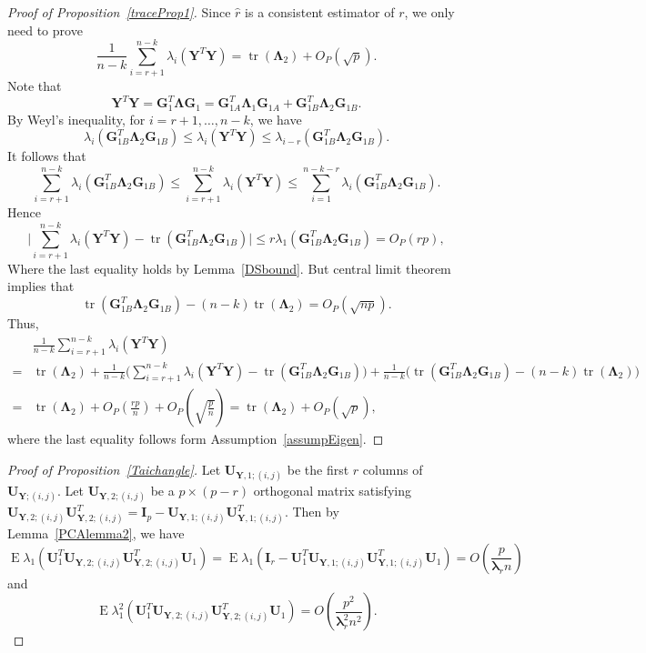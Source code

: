 \documentclass[12pt]{article} %
\DeclareMathOperator{\mytr}{tr}
\DeclareMathOperator{\myE}{E}
\newcommand{\bY}{\mathbf{Y}}
\newcommand{\bG}{\mathbf{G}}
\newcommand{\bI}{\mathbf{I}}
\newcommand{\bU}{\mathbf{U}}
\newcommand{\bfsym}[1]{\ensuremath{\boldsymbol{#1}}}
\def\blambda {\bfsym {\lambda}}
\def\bLambda {\bfsym {\Lambda}}
\theoremstyle{definition}
\begin{document}
\begin{appendices}
\begin{proof}[Proof of Proposition~\ref{traceProp1}]
    Since $\hat{r}$ is a consistent estimator of $r$, we only need to prove
    $$
    \frac{1 }{n-k}
        \sum_{i=r+1}^{n-k}\lambda_i(\bY^T\bY)
        =\mytr(\bLambda_2)+O_P(\sqrt{p}).
    $$
    Note that
$$
\bY^T \bY =\bG_1^T \bLambda \bG_1
=
\bG_{1A}^T \bLambda_1 \bG_{1A}+
\bG_{1B}^T \bLambda_2 \bG_{1B}.
$$
By Weyl's inequality, for $i=r+1,\ldots, n-k$, we have
$$
\lambda_{i}(\bG_{1B}^T \bLambda_2 \bG_{1B})\leq \lambda_i(\bY^T \bY)\leq \lambda_{i-r}(\bG_{1B}^T \bLambda_2 \bG_{1B}).
$$
It follows that
$$
\sum_{i=r+1}^{n-k}\lambda_{i}(\bG_{1B}^T \bLambda_2 \bG_{1B})\leq \sum_{i=r+1}^{n-k}\lambda_i(\bY^T \bY)\leq \sum_{i=1}^{n-k-r}\lambda_{i}(\bG_{1B}^T \bLambda_2 \bG_{1B}).
$$
Hence
$$
 \big|\sum_{i=r+1}^{n-k}\lambda_i(\bY^T \bY)- \mytr(\bG_{1B}^T \bLambda_2 \bG_{1B})\big|\leq r \lambda_1(\bG_{1B}^T \bLambda_2 \bG_{1B})=O_P(rp),
$$
    Where the last equality holds by Lemma~\ref{DSbound}.
But central limit theorem implies that
$$\mytr(\bG_{1B}^T \bLambda_2 \bG_{1B})-(n-k)\mytr(\bLambda_2)%
=O_P(\sqrt{np}).$$
Thus,
$$
    \begin{aligned}
        &\frac{1}{n-k}\sum_{i=r+1}^{n-k}\lambda_i (\bY^T \bY)\\
        =&\mytr(\bLambda_2)+
        \frac{1}{n-k}\big(\sum_{i=r+1}^{n-k}\lambda_i(\bY^T \bY)-\mytr(\bG_{1B}^T \bLambda_2 \bG_{1B})\big) +\frac{1}{n-k}\big(\mytr(\bG_{1B}^T \bLambda_2 \bG_{1B})-(n-k)\mytr(\bLambda_2)\big)\\
        =&\mytr(\bLambda_2)+O_P(\frac{rp}{n})+O_P(\sqrt{\frac{p}{n}})
        =\mytr(\bLambda_2)+O_P(\sqrt{p}),
    \end{aligned}
$$
    where the last equality follows form Assumption~\ref{assumpEigen}.
\end{proof}

    \begin{proof}[Proof of Proposition~\ref{Taichangle}]
        Let $\bU_{\bY,1;(i,j)}$ be the first $r$ columns of $\bU_{\bY;(i,j)}$.
        Let $\bU_{\bY,2;(i,j)}$ be a $p\times (p-r)$ orthogonal matrix satisfying $\bU_{\bY,2;(i,j)}\bU_{\bY,2;(i,j)}^T= \bI_p-\bU_{\bY,1;(i,j)}\bU_{\bY,1;(i,j)}^T$.
        Then by Lemma~\ref{PCAlemma2}, we have
        $$
        \myE\lambda_1(\bU_1^T \bU_{\bY,2;(i,j)}\bU_{\bY,2;(i,j)}^T \bU_1)
        =
        \myE\lambda_1(\bI_r-\bU_1^T \bU_{\bY,1;(i,j)}\bU_{\bY,1;(i,j)}^T \bU_1)
        =
        O(\frac{p}{\blambda_r n})
        $$
        and
        $$
        \myE\lambda_1^2(\bU_1^T \bU_{\bY,2;(i,j)}\bU_{\bY,2;(i,j)}^T \bU_1)
        =
        O(\frac{p^2}{\blambda_r^2 n^2}).
        $$



\end{proof}
\end{appendices}
\end{document}
